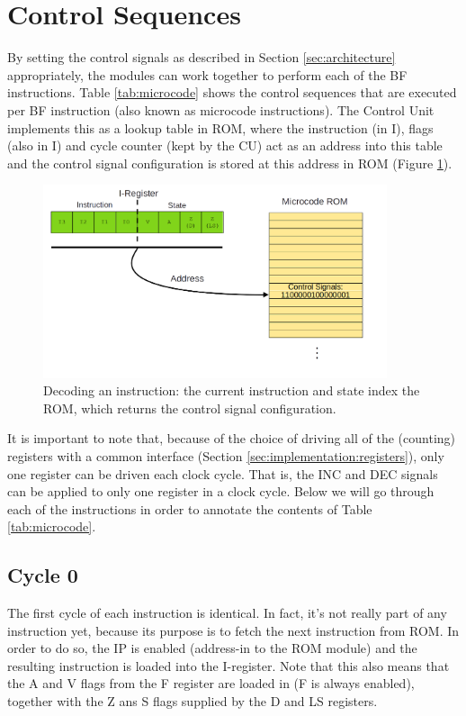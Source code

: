 \section{Control Sequences} \label{sec:sequences}
By setting the control signals as described in Section \ref{sec:architecture} appropriately, the modules can work together to perform each of the BF instructions. Table \ref{tab:microcode} shows the control sequences that are executed per BF instruction (also known as microcode instructions). The Control Unit implements this as a lookup table in ROM, where the instruction (in I), flags (also in I) and cycle counter (kept by the CU) act as an address into this table and the control signal configuration is stored at this address in ROM (Figure \ref{fig:decoder}).

\begin{figure}[H]
  \centering
  \includegraphics[width=0.9\textwidth]{img/instruction_decoding}
  \caption{Decoding an instruction: the current instruction and state index the ROM, which returns the control signal configuration.}
  \label{fig:decoder}
\end{figure}

It is important to note that, because of the choice of driving all of the (counting) registers with a common interface (Section \ref{sec:implementation:registers}), only one register can be driven each clock cycle. That is, the INC and DEC signals can be applied to only one register in a clock cycle. Below we will go through each of the instructions in order to annotate the contents of Table \ref{tab:microcode}.


\subsection{Cycle 0}
The first cycle of each instruction is identical. In fact, it's not really part of any instruction yet, because its purpose is to fetch the next instruction from ROM. In order to do so, the IP is enabled (address-in to the ROM module) and the resulting instruction is loaded into the I-register. Note that this also means that the A and V flags from the F register are loaded in (F is always enabled), together with the Z ans S flags supplied by the D and LS registers.

